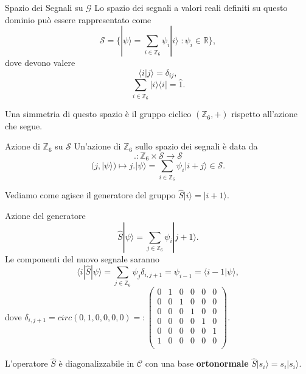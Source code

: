 \documentclass[xcolor=dvipsnames]{beamer}
\newcommand{\R}{\mathbb{R}}
\newcommand{\Z}{\mathbb{Z}}
\newcommand{\mc}[1]{\mathcal{#1}}
\begin{document}
\begin{frame}
    \begin{block}{Spazio dei Segnali su $\mc{G}$}
        Lo spazio dei segnali a valori reali definiti su questo dominio può essere rappresentato come
        \[ \mc{S} =\{ | \psi \rangle =  \sum_{i \in \Z_6} \psi_i | i \rangle \; : \psi_i \in \R \} ,\] 
        dove devono valere 
        \[ \langle i | j \rangle = \delta_{ij}, \] 
        \[ \sum_{i \in \Z_6} | i \rangle \langle i | = \widehat{1} .\]      
    \end{block}
\end{frame}

\begin{frame}
    Una simmetria di questo spazio è il gruppo ciclico $(\Z_6,+)$ rispetto all'azione che segue.
    \begin{block}{Azione di $\Z_6$ su $\mc{S}$ }
        Un'azione di $\Z_6$ sullo spazio dei segnali è data da
        \[ . : \Z_6 \times \mc{S} \to \mc{S}\] \[ (j,| \psi \rangle) \mapsto j.| \psi \rangle = \sum_{i \in \Z_6} \psi_i | i + j \rangle \in \mc{S} .\]        
    \end{block}   
\end{frame}

\begin{frame}
Vediamo come agisce il generatore del gruppo $\widehat{S} | i \rangle  = | i+1 \rangle$.
    \begin{block}{Azione del generatore}
        \[ \widehat{S}| \psi \rangle = \sum_{j \in \Z_6} \psi_{i} | j + 1 \rangle.\]
        Le componenti del nuovo segnale saranno
        \[ \langle i | \widehat{S} | \psi \rangle =  \sum_{j \in \Z_6} \psi_j \delta_{i,j+1} = \psi_{i-1} = \langle i-1 | \psi \rangle, \]
        dove $ \delta_{i,j+1} = circ(0,1,0,0,0,0) =: \begin{pmatrix} 0 & 1 & 0 & 0 & 0 & 0 \\ 0 & 0 & 1 & 0 & 0 & 0 \\ 0 & 0 & 0 & 1 & 0 & 0
        \\ 0 & 0 & 0 & 0 & 1 & 0 \\ 0 & 0 & 0 & 0 & 0 & 1 \\ 1 & 0 & 0 & 0 & 0 & 0 \\ 
    \end{pmatrix} $.
    \end{block}  
    L'operatore $\widehat{S}$ è diagonalizzabile in $\mc{C}$ con una base \textbf{ortonormale} $\widehat{S}|s_i \rangle = s_i | s_i \rangle$.  
\end{frame}
\end{document}
